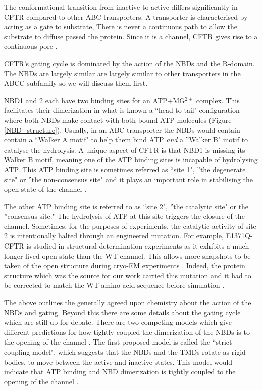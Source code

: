 \label{NBD_structure}
\endgroup

The conformational transition from inactive to active differs significantly in CFTR compared to other ABC transporters. A transporter is characterised by acting as a gate to substrate, There is never a continuous path to allow the substrate to diffuse passed the protein. Since it is a channel, CFTR gives rise to a continuous pore \cite{linsdell2018}. 

CFTR's gating cycle is dominated by the action of the NBDs and the R-domain. The NBDs are largely similar are largely similar to other transporters in the ABCC subfamily so we will discuss them first. 

NBD1 and 2 each have two binding sites for an ATP$+$MG$^{2+}$ complex. This facilitates their dimerization in what is known a ``head to tail" configuration where both NBDs make contact with both bound ATP molecules \cite{gout2012}  (Figure \ref{NBD_structure}). Usually, in an ABC transporter the NBDs would contain contain a ``Walker A motif" to help them bind ATP \textit {and} a ''Walker B" motif to catalyse the hydrolysis. A unique aspect of CFTR is that NBD1 is missing its Walker B motif, meaning one of the ATP binding sites is incapable of hydrolysing ATP. This ATP binding site is sometimes referred as ``site 1", ''the degenerate site" or ''the non-consensus site" and it plays an important role in stabilising the open state of the channel \cite{yeh2022, csanady2019a}.

The other ATP binding site is referred to as ``site 2", ''the catalytic site" or the ''consensus site." The hydrolysis of ATP at this site triggers the closure of the channel. Sometimes, for the purposes of experiments, the catalytic activity of site 2 is intentionally halted through an engineered mutation. For example, E1371Q-CFTR is studied in structural determination experiments as it exhibits a much longer lived open state than the WT channel. This allows more snapshots to be taken of the open structure during cryo-EM experiments \cite{ramjeesingh1999, gout2012, muallem2009, hwang2013}. Indeed, the protein structure which was the source for our work carried this mutation and it had to be corrected to match the WT amino acid sequence before simulation \cite{zhang2018}. 

The above outlines the generally agreed upon chemistry about the action of the NBDs and gating. Beyond this there are some details about the gating cycle which are still up for debate. There are two competing models which give different predictions for how tightly coupled the dimerization of the NBDs is to the opening of the channel \cite{yeh2022}. The first proposed model is called the ``strict coupling model", which suggests that the NBDs and the TMDs rotate as rigid bodies, to move between the active and inactive states. This model would indicate that ATP binding and NBD dimerization is tightly coupled to the opening of the channel \cite{jih2012}. 

